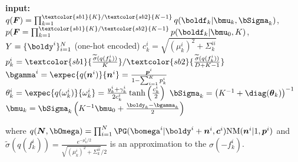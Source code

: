 \begin{algorithm}[H]
    \caption{\ac{CAVI} updates: $\textcolor{sb1}{K}/\textcolor{sb2}{K - 1}$ latent \acp{GP} for $K$ classes}
    \begin{algorithmic}
    \State \textbf{input:} $q(\boldsymbol{F}) = \prod_{k=1}^{\textcolor{sb1}{K}/\textcolor{sb2}{K - 1}} q(\boldf_k|\bmu_k, \bSigma_k)$, $p(\boldsymbol{F} = \prod_{k=1}^{\textcolor{sb1}{K}/\textcolor{sb2}{K - 1}} p(\boldf_k|\bmu_0, K)$, $Y=\{\boldy^i\}_{i=1}^N$ (one-hot encoded)
        \State $c^i_k = \sqrt{(\mu^i_k)^2 + \Sigma_k^{ii}}$
        \State $p^i_k = \textcolor{sb1}{\frac{\widetilde{\sigma}(q(f_k^i))}{K}}/\textcolor{sb2}{\frac{\widetilde{\sigma}(q(f_k^i))}{D + K - 1}}$
        \State $\bgamma^i = \expec{q(\boldsymbol{n}^i)}{\boldsymbol{n}^i} = \frac{\boldsymbol{p}^i}{1 - \sum_{i=1}^K p^i_k}$
        \State $\theta_k^i = \expec{q(\omega_k^i)}{\omega_k^i} = \frac{y_k^i + \gamma_k^i}{2c_k^i}\tanh\left(\frac{c_k^i}{2}\right)$
        \State $\bSigma_k = \left(K^{-1} + \diag(\boldsymbol{\theta}_k)\right)^{-1}$
        \State $\bmu_k = \bSigma_k\left(K^{-1}\bmu_0 + \frac{\boldy_k - \bgamma_k}{2}\right)$
    \EndWhile
    \end{algorithmic}
    where $q(\boldsymbol{N}, \bOmega) = \prod_{i=1}^N \PG(\bomega^i|\boldy^i + \boldsymbol{n}^i, \boldsymbol{c}^i)\mathrm{NM}(\boldsymbol{n}^i|1, \boldsymbol{p}^i)$ and $\widetilde{\sigma}(q(f_k^i)) = \frac{e^{-\mu_k^i/2}}{\sqrt{(\mu_k^i)^2 + \Sigma^{ii}_k} / 2}$ is an approximation to the $\sigma(-f^i_k)$.
    \label{alg:cavi_multiclass}
\end{algorithm}

